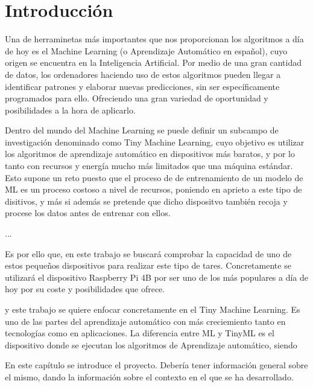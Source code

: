 \documentclass[a4paper, 12pt]{book}
\begin{document}

\cleardoublepage
\chapter{Introducción}
\label{sec:intro}

Una de herraminetas más importantes que nos proporcionan los algoritmos a día de hoy es el Machine Learning (o Aprendizaje Automático en español), cuyo origen se encuentra en la Inteligencia Artificial. Por medio de una gran cantidad de datos, los ordenadores haciendo uso de estos algoritmos pueden llegar a identificar patrones y elaborar nuevas predicciones, sin ser específicamente programados para ello. Ofreciendo una gran variedad de oportunidad y posibilidades a la hora de aplicarlo.

Dentro del mundo del Machine Learning se puede definir un subcampo de investigación denominado como Tiny Machine Learning, cuyo objetivo es utilizar los algoritmos de aprendizaje automático en dispositivos más baratos, y por lo tanto con recursos y energía mucho más limitados que una máquina estándar. Esto supone un reto puesto que el proceso de de entrenamiento de un modelo de ML es un proceso costoso a nivel de recursos, poniendo en aprieto a este tipo de disitivos, y más si además se pretende que dicho dispositvo también recoja y procese los datos antes de entrenar con ellos.

...

Es por ello que, en este trabajo se buscará comprobar la capacidad de uno de estos pequeños dispositivos para realizar este tipo de tares. Concretamente se utilizará el dispositivo Raspberry Pi 4B por ser uno de los más populares a día de hoy por su coste y posibilidades que ofrece.

y este trabajo se quiere enfocar concretamente en el Tiny Machine Learning. Es uno de las partes del aprendizaje automático con más creciemiento tanto en tecnologías como en aplicaciones. La diferencia entre ML y TinyML es el dispositivo donde se ejecutan los algoritmos de Aprendizaje automático, siendo 

En este capítulo se introduce el proyecto.
Debería tener información general sobre el mismo, dando la información sobre el contexto en el que se ha desarrollado.
\end{document}
